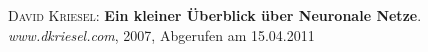 \begin{thebibliography}{---}

  \textsc{David Kriesel}: 
  \textbf{Ein kleiner Überblick über Neuronale Netze}.
  \emph{www.dkriesel.com}, 2007, Abgerufen am 15.04.2011

\end{thebibliography}

